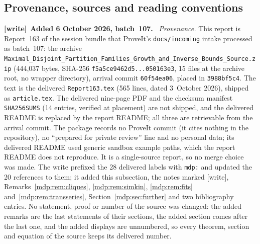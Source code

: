 \documentclass[11pt,letterpaper]{article}
\numberwithin{equation}{section}
\theoremstyle{remark}\newtheorem{remark}[theorem]{Remark}
\newcommand{\file}[1]{\nolinkurl{#1}}
\newenvironment{writenote}[1][]{\par\smallskip\begingroup\small
 \noindent\textbf{[write]}\if\relax\detokenize{#1}\relax\else~\textbf{#1.}\fi\ }%
 {\par\endgroup\smallskip}
\begin{document}
\subsection{Provenance, sources and reading conventions}\label{mdp:sec:provenance}
\begin{writenote}[Added 6 October 2026, batch~107]
\emph{Provenance.} This report is Report~163 of the session bundle that
ProveIt's \file{docs/incoming} intake processed as batch~107: the archive
\file{Maximal_Disjoint_Partition_Families_Growth_and_Inverse_Bounds_Source.zip}
(444{,}037 bytes, SHA-256 \file{f5a5ce9462d5...050163e3}, 15 files at the
archive root, no wrapper directory), arrival commit \file{60f54ea06}, placed
in \file{3988bf5c4}. The text is the delivered \file{Report163.tex} (565
lines, dated 3~October 2026), shipped as \file{article.tex}. The delivered
nine-page PDF and the checksum manifest \file{SHA256SUMS} (14 entries,
verified at placement) are not shipped, and the delivered README is replaced
by the report README; all three are retrievable from the arrival commit. The
package records no ProveIt commit (it cites nothing in the repository), no
``prepared for private review'' line and no personal data; its delivered
README used generic sandbox example paths, which the report README does not
reproduce. It is a single-source report, so no merge choice was made. The
write prefixed the 28 delivered labels with \file{mdp:} and updated the 20
references to them; it added this subsection, the notes marked [write],
Remarks~\ref{mdp:rem:cliques}, \ref{mdp:rem:simkin}, \ref{mdp:rem:fits}
and~\ref{mdp:rem:transseries}, Section~\ref{mdp:sec:further} and two
bibliography entries. No statement, proof or number of the source was
changed: the added remarks are the last statements of their sections, the
added section comes after the last one, and the added displays are
unnumbered, so every theorem, section and equation of the source keeps its
delivered number.


\end{writenote}
\end{document}
